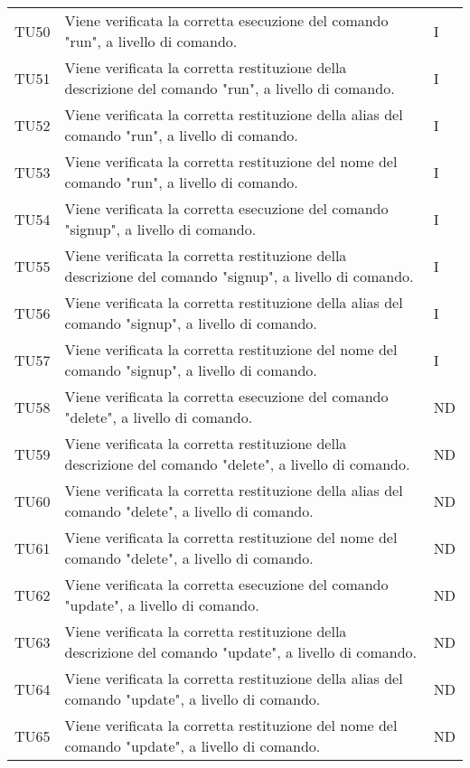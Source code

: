 \begin{longtable}{|C{1.5cm}|C{10cm}|C{1.5cm}|}
	TU50 &
	Viene verificata la corretta esecuzione del comando "run", a livello di comando.  &
	I \\

	TU51 &
	Viene verificata la corretta restituzione della descrizione del comando "run", a livello di comando.  &
	I \\

	TU52 &
	Viene verificata la corretta restituzione della alias del comando "run", a livello di comando.  &
	I \\

	TU53 &
	Viene verificata la corretta restituzione del nome del comando "run", a livello di comando.  &
	I \\

	TU54 &
	Viene verificata la corretta esecuzione del comando "signup", a livello di comando.  &
	I \\

	TU55 &
	Viene verificata la corretta restituzione della descrizione del comando "signup", a livello di comando.  &
	I \\

	TU56 &
	Viene verificata la corretta restituzione della alias del comando "signup", a livello di comando.  &
	I \\

	TU57 &
	Viene verificata la corretta restituzione del nome del comando "signup", a livello di comando.  &
	I \\

	TU58 &
	Viene verificata la corretta esecuzione del comando "delete", a livello di comando.  &
	ND \\

	TU59 &
	Viene verificata la corretta restituzione della descrizione del comando "delete", a livello di comando.  &
	ND \\

	TU60 &
	Viene verificata la corretta restituzione della alias del comando "delete", a livello di comando.  &
	ND \\

	TU61 &
	Viene verificata la corretta restituzione del nome del comando "delete", a livello di comando.  &
	ND \\

	TU62 &
	Viene verificata la corretta esecuzione del comando "update", a livello di comando.  &
	ND \\

	TU63 &
	Viene verificata la corretta restituzione della descrizione del comando "update", a livello di comando.  &
	ND \\

	TU64 &
	Viene verificata la corretta restituzione della alias del comando "update", a livello di comando.  &
	ND \\

	TU65 &
	Viene verificata la corretta restituzione del nome del comando "update", a livello di comando.  &
	ND \\
\end{longtable}

